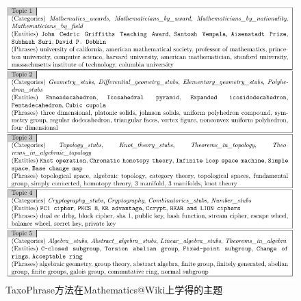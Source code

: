 \begin{frame}

\vspace{-7mm}
\begin{figure}
	\centering
	\caption{TaxoPhrase方法在Mathematics@Wiki上学得的主题}
    \includegraphics[width=0.6\columnwidth]{img/TD+/maths.pdf}
\end{figure}

\end{frame}




